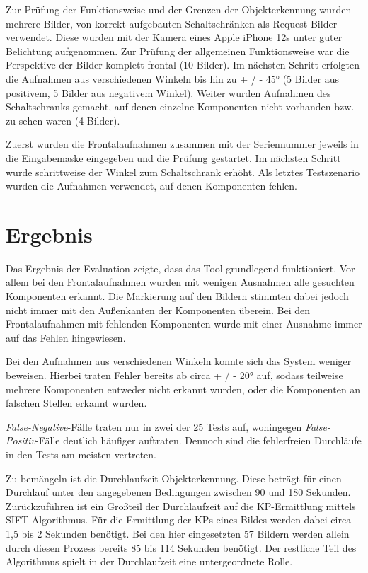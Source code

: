\documentclass[
    type=Prakikumsbericht,
    status=draft, %
    language=german, %
    bibengine=bibtex,
]{unibwm-inf-thesis}
\begin{document}
    Zur Prüfung der Funktionsweise und der Grenzen der Objekterkennung wurden mehrere Bilder, von korrekt aufgebauten Schaltschränken als Request-Bilder verwendet.
    Diese wurden mit der Kamera eines Apple iPhone 12s unter guter Belichtung aufgenommen.
    Zur Prüfung der allgemeinen Funktionsweise war die Perspektive der Bilder komplett frontal (10 Bilder).
    Im nächsten Schritt erfolgten die Aufnahmen aus verschiedenen Winkeln bis hin zu + / - 45° (5 Bilder aus positivem, 5 Bilder aus negativem Winkel).
    Weiter wurden Aufnahmen des Schaltschranks gemacht, auf denen einzelne Komponenten nicht vorhanden bzw. zu sehen waren (4 Bilder).

    Zuerst wurden die Frontalaufnahmen zusammen mit der Seriennummer jeweils in die Eingabemaske eingegeben und die Prüfung gestartet.
    Im nächsten Schritt wurde schrittweise der Winkel zum Schaltschrank erhöht.
    Als letztes Testszenario wurden die Aufnahmen verwendet, auf denen Komponenten fehlen.

    \section{Ergebnis}
    Das Ergebnis der Evaluation zeigte, dass das Tool grundlegend funktioniert.
    Vor allem bei den Frontalaufnahmen wurden mit wenigen Ausnahmen alle gesuchten Komponenten erkannt.
    Die Markierung auf den Bildern stimmten dabei jedoch nicht immer mit den Außenkanten der Komponenten überein.
    Bei den Frontalaufnahmen mit fehlenden Komponenten wurde mit einer Ausnahme immer auf das Fehlen hingewiesen.

    Bei den Aufnahmen aus verschiedenen Winkeln konnte sich das System weniger beweisen.
    Hierbei traten Fehler bereits ab circa + / - 20° auf, sodass teilweise mehrere Komponenten entweder nicht erkannt wurden, oder die Komponenten an falschen Stellen erkannt wurden.

    \textit{False-Negative}-Fälle traten nur in zwei der 25 Tests auf, wohingegen \textit{False-Positiv}-Fälle deutlich häufiger auftraten.
    Dennoch sind die fehlerfreien Durchläufe in den Tests am meisten vertreten.

    Zu bemängeln ist die Durchlaufzeit Objekterkennung.
    Diese beträgt für einen Durchlauf unter den angegebenen Bedingungen zwischen 90 und 180 Sekunden.
    Zurückzuführen ist ein Großteil der Durchlaufzeit auf die \ac{KP}-Ermittlung mittels \ac{SIFT}-Algorithmus.
    Für die Ermittlung der \acp{KP} eines Bildes werden dabei circa 1,5 bis 2 Sekunden benötigt.
    Bei den hier eingesetzten 57 Bildern werden allein durch diesen Prozess bereits 85 bis 114 Sekunden benötigt.
    Der restliche Teil des Algorithmus spielt in der Durchlaufzeit eine untergeordnete Rolle.
\end{document}
